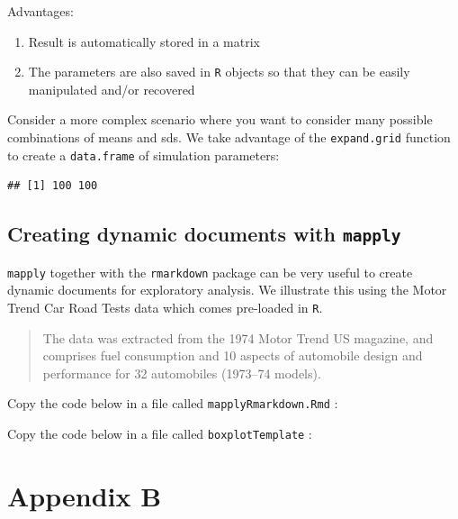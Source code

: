 \documentclass[]{book}
\makeatletter
\newenvironment{Shaded}{\begin{snugshade}}{\end{snugshade}}
\newcommand{\KeywordTok}[1]{\textcolor[rgb]{0.13,0.29,0.53}{\textbf{#1}}}
\newcommand{\DataTypeTok}[1]{\textcolor[rgb]{0.13,0.29,0.53}{#1}}
\newcommand{\DecValTok}[1]{\textcolor[rgb]{0.00,0.00,0.81}{#1}}
\newcommand{\StringTok}[1]{\textcolor[rgb]{0.31,0.60,0.02}{#1}}
\newcommand{\OperatorTok}[1]{\textcolor[rgb]{0.81,0.36,0.00}{\textbf{#1}}}
\newcommand{\NormalTok}[1]{#1}
\providecommand{\tightlist}{%
  \setlength{\itemsep}{0pt}\setlength{\parskip}{0pt}}
\newenvironment{kframe}{%
\medskip{}
\setlength{\fboxsep}{.8em}
 \def\at@end@of@kframe{}%
 \ifinner\ifhmode%
  \def\at@end@of@kframe{\end{minipage}}%
  \begin{minipage}{\columnwidth}%
 \fi\fi%
 \def\FrameCommand##1{\hskip\@totalleftmargin \hskip-\fboxsep
 \colorbox{shadecolor}{##1}\hskip-\fboxsep
     \hskip-\linewidth \hskip-\@totalleftmargin \hskip\columnwidth}%
 \MakeFramed {\advance\hsize-\width
   \@totalleftmargin\z@ \linewidth\hsize
   \@setminipage}}%
 {\par\unskip\endMakeFramed%
 \at@end@of@kframe}
\renewenvironment{Shaded}{\begin{kframe}}{\end{kframe}}
\theoremstyle{definition}
\theoremstyle{definition}
\theoremstyle{definition}
\theoremstyle{remark}
\makeatother
\begin{document}
Advantages:

\begin{enumerate}
\def\labelenumi{\arabic{enumi}.}
\tightlist
\item
  Result is automatically stored in a matrix
\item
  The parameters are also saved in \texttt{R} objects so that they can
  be easily manipulated and/or recovered
\end{enumerate}

Consider a more complex scenario where you want to consider many
possible combinations of means and sds. We take advantage of the
\texttt{expand.grid} function to create a \texttt{data.frame} of
simulation parameters:

\begin{Shaded}
\end{Shaded}

\begin{verbatim}
## [1] 100 100
\end{verbatim}

\section{\texorpdfstring{Creating dynamic documents with
\texttt{mapply}}{Creating dynamic documents with mapply}}\label{creating-dynamic-documents-with-mapply}

\texttt{mapply} together with the \texttt{rmarkdown} package
\citep{R-rmarkdown} can be very useful to create dynamic documents for
exploratory analysis. We illustrate this using the Motor Trend Car Road
Tests data which comes pre-loaded in \texttt{R}.

\begin{quote}
The data was extracted from the 1974 Motor Trend US magazine, and
comprises fuel consumption and 10 aspects of automobile design and
performance for 32 automobiles (1973--74 models).
\end{quote}

Copy the code below in a file called \texttt{mapplyRmarkdown.Rmd} :

Copy the code below in a file called \texttt{boxplotTemplate} :

\chapter{Appendix B}\label{appendix-b}


\end{document}
